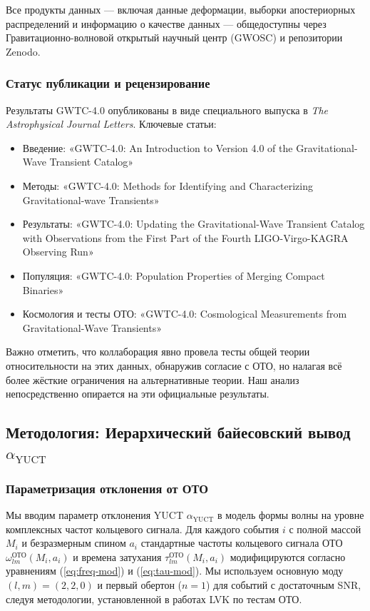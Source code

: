 \documentclass[12pt,a4paper]{article}
\theoremstyle{remark}
\begin{document}
	Все продукты данных — включая данные деформации, выборки апостериорных распределений и информацию о качестве данных — общедоступны через Гравитационно-волновой открытый научный центр (GWOSC) и репозитории Zenodo.
	
	\subsubsection{Статус публикации и рецензирование}
	
	Результаты GWTC-4.0 опубликованы в виде специального выпуска в \textit{The Astrophysical Journal Letters}. Ключевые статьи:
	
	\begin{itemize}
		\item Введение: «GWTC-4.0: An Introduction to Version 4.0 of the Gravitational-Wave Transient Catalog»
		\item Методы: «GWTC-4.0: Methods for Identifying and Characterizing Gravitational-wave Transients»
		\item Результаты: «GWTC-4.0: Updating the Gravitational-Wave Transient Catalog with Observations from the First Part of the Fourth LIGO-Virgo-KAGRA Observing Run»
		\item Популяция: «GWTC-4.0: Population Properties of Merging Compact Binaries»
		\item Космология и тесты ОТО: «GWTC-4.0: Cosmological Measurements from Gravitational-Wave Transients»
	\end{itemize}
	
	Важно отметить, что коллаборация явно провела тесты общей теории относительности на этих данных, обнаружив согласие с ОТО, но налагая всё более жёсткие ограничения на альтернативные теории. Наш анализ непосредственно опирается на эти официальные результаты.
	
	\subsection{Методология: Иерархический байесовский вывод $\alpha_{\text{YUCT}}$}
	
	\subsubsection{Параметризация отклонения от ОТО}
	
	Мы вводим параметр отклонения YUCT $\alpha_{\text{YUCT}}$ в модель формы волны на уровне комплексных частот кольцевого сигнала. Для каждого события $i$ с полной массой $M_i$ и безразмерным спином $a_i$ стандартные частоты кольцевого сигнала ОТО $\omega_{lm}^{\text{ОТО}}(M_i, a_i)$ и времена затухания $\tau_{lm}^{\text{ОТО}}(M_i, a_i)$ модифицируются согласно уравнениям (\ref{eq:freq-mod}) и (\ref{eq:tau-mod}). Мы используем основную моду $(l,m) = (2,2,0)$ и первый обертон ($n=1$) для событий с достаточным SNR, следуя методологии, установленной в работах LVK по тестам ОТО.
	
\end{document}

